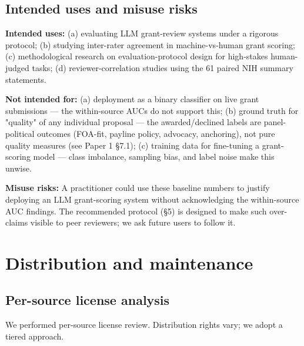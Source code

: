 \documentclass[11pt]{article}
\begin{document}
\subsection{Intended uses and misuse risks}

\textbf{Intended uses:} (a) evaluating LLM grant-review systems under a rigorous protocol; (b) studying inter-rater agreement in machine-vs-human grant scoring; (c) methodological research on evaluation-protocol design for high-stakes human-judged tasks; (d) reviewer-correlation studies using the 61 paired NIH summary statements.

\textbf{Not intended for:} (a) deployment as a binary classifier on live grant submissions --- the within-source AUCs do not support this; (b) ground truth for "quality" of any individual proposal --- the awarded/declined labels are panel-political outcomes (FOA-fit, payline policy, advocacy, anchoring), not pure quality measures (see Paper 1 §7.1); (c) training data for fine-tuning a grant-scoring model --- class imbalance, sampling bias, and label noise make this unwise.

\textbf{Misuse risks:} A practitioner could use these baseline numbers to justify deploying an LLM grant-scoring system without acknowledging the within-source AUC findings. The recommended protocol (§5) is designed to make such over-claims visible to peer reviewers; we ask future users to follow it.

\section{Distribution and maintenance}

\subsection{Per-source license analysis}

We performed per-source license review. Distribution rights vary; we adopt a tiered approach.
\end{document}
